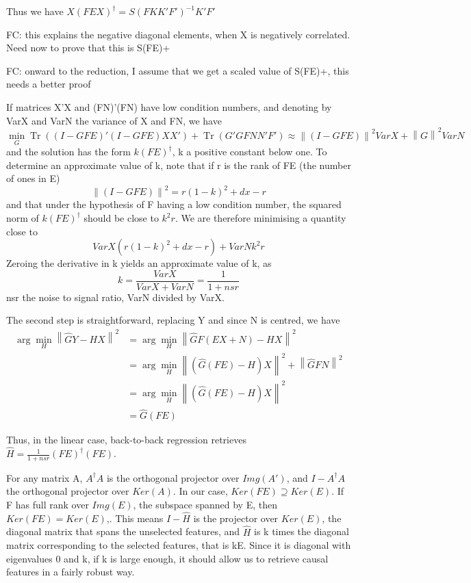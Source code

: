 \documentclass{article}
\DeclareMathOperator{\Tr}{Tr}
\begin{document}
Thus we have $X(FEX)^\dagger =S (FKK'F')^{-1} K'F'$  

FC: this explains the negative diagonal elements, when X is negatively correlated. Need now to prove that this is S(FE)+

FC: onward to the reduction, I assume that we get a scaled value of S(FE)+, this needs a better proof

If matrices X'X and (FN)'(FN) have low condition numbers, and denoting by VarX and VarN the variance of X and FN, we have $$\min_G \Tr ((I-GFE)'(I-GFE)XX') + \Tr (G'GFNN'F') \approx \left \| (I-GFE)\right\| ^2 VarX  + \left \| G\right \| ^2 VarN$$and the solution has the form $k(FE)^\dagger$, k a positive constant below one. To determine an approximate value of k, note that if r is the rank of FE (the number of ones in E) $$\left \| (I-GFE)\right\| ^2 = r (1-k)^2 + dx - r$$ and that under the hypothesis of F having a low condition number, the squared norm of $k(FE)^\dagger$ should be close to $k^2r$. We are therefore minimising a quantity close to $$ VarX (r (1-k)^2 + dx - r) + VarN k^2 r$$ Zeroing the derivative in k yields an approximate value of k, as $$k= \frac {VarX}{VarX + VarN}=\frac{1}{1+nsr}$$ nsr the noise to signal ratio, VarN divided by VarX.

The second step is straightforward, replacing Y and since N is centred, we have
\begin{equation}
\begin{aligned}
\arg \min_H \left \| \hat GY - HX \right \|^2 &=\arg  \min_H \left \| \hat GF(EX+N) - HX \right \|^2 \\
&=\arg \min_H \left \| (\hat G(FE)-H)X \right \| ^2 + \left \| \hat GFN \right \| ^2\\
&= \arg \min_H \left \| (\hat G(FE)-H)X \right \| ^2\\
&=\hat G (FE)
\end{aligned}
\end{equation}

Thus, in the linear case, back-to-back regression retrieves $\hat H = \frac{1}{1+nsr}(FE)^{\dagger}(FE)$.

For any matrix A, $A^\dagger A$ is the orthogonal projector over $Img(A')$, and $I-A^\dagger A$ the orthogonal projector over $Ker(A)$.
%
In our case, $Ker(FE)\supseteq Ker(E)$.
%
If F has full rank over $Img(E)$, the subspace spanned by E, then $Ker(FE) = Ker(E)$,.
%
This means $I - \hat H$ is the projector over $Ker(E)$, the diagonal matrix that spans the unselected features, and $\hat H$ is k times the diagonal matrix corresponding to the selected features, that is kE. Since it is diagonal with eigenvalues 0 and k, if k is large enough, it should allow us to retrieve causal features in a fairly robust way.
\end{document}
